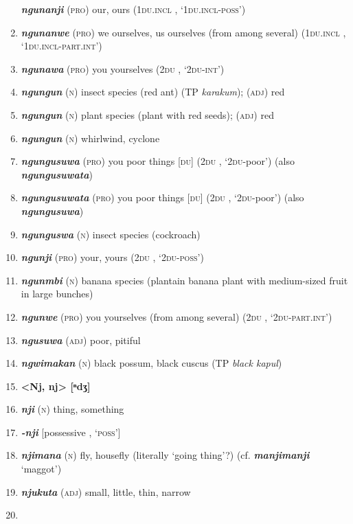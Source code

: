 \begin{enumerate}[noitemsep, label={}, align=left, widest=190, labelsep=1ex,leftmargin=*,itemindent=-10pt]
\textbf{\textit{ngunanji}} (\textsc{pro}) our, ours (\textsc{1du.incl} , ‘\textsc{1du.incl-poss}’) \item 
\textbf{\textit{ngunanwe}} (\textsc{pro}) we ourselves, us ourselves (from among several) (\textsc{1du.incl} , ‘\textsc{1du.incl-part.int}’) \item 
\textbf{\textit{ngunawa}} (\textsc{pro}) you yourselves (\textsc{2du} , ‘\textsc{2du-int}’) \item 
\textbf{\textit{ngungun}} (\textsc{n}) insect species (red ant) (TP \textit{karakum}); (\textsc{adj}) red \item 
\textbf{\textit{ngungun}} (\textsc{n}) plant species (plant with red seeds); (\textsc{adj}) red \item 
\textbf{\textit{ngungun}} (\textsc{n}) whirlwind, cyclone \item 
\textbf{\textit{ngungusuwa}} (\textsc{pro}) you poor things [\textsc{du}] (2\textsc{du} , ‘\textsc{2du}-poor’) (also \textbf{\textit{ngungusuwata}}) \item 
\textbf{\textit{ngungusuwata}} (\textsc{pro}) you poor things [\textsc{du}] (2\textsc{du} , ‘\textsc{2du}-poor’) (also \textbf{\textit{ngungusuwa}}) \item 
\textbf{\textit{ngunguswa}} (\textsc{n}) insect species (cockroach) \item 
\textbf{\textit{ngunji}} (\textsc{pro}) your, yours (\textsc{2du} , ‘\textsc{2du-poss}’) \item 
\textbf{\textit{ngunmbi}} (\textsc{n}) banana species (plantain banana plant with medium-sized fruit in large bunches) \item 
\textbf{\textit{ngunwe}} (\textsc{pro}) you yourselves (from among several) (\textsc{2du} , ‘\textsc{2du-part.int}’) \item 
\textbf{\textit{ngusuwa}} (\textsc{adj}) poor, pitiful \item 
\textbf{\textit{ngwimakan}} (\textsc{n}) black possum, black cuscus (TP \textit{black kapul})\\ \item 

\noindent \textbf{<Nj, nj>      [ⁿdʒ]}\\ \item 

\textbf{\textit{nji}} (\textsc{n}) thing, something \item 
\textbf{\textit{-nji}} [possessive , ‘\textsc{poss}’] \item 
\textbf{\textit{njimana}} (\textsc{n}) fly, housefly (literally ‘going thing’?) (cf. \textbf{\textit{manjimanji}} ‘maggot’) \item 
\textbf{\textit{njukuta}} (\textsc{adj}) small, little, thin, narrow\\ \item 


\end{enumerate}
